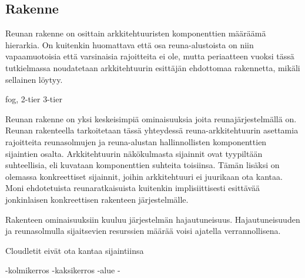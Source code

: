 \subsection{Rakenne}
Reunan rakenne on osittain arkkitehtuuristen komponenttien määräämä hierarkia. On kuitenkin huomattava että osa reuna-alustoista on niin vapaamuotoisia että varsinaisia rajoitteita ei ole, mutta periaatteen vuoksi tässä tutkielmassa noudatetaan arkkitehtuurin esittäjän ehdottomaa rakennetta, mikäli sellainen löytyy.

fog,
2-tier
3-tier

Reunan rakenne on yksi keskeisimpiä ominaisuuksia joita reunajärjestelmällä on. Reunan rakenteella tarkoitetaan tässä yhteydessä reuna-arkkitehtuurin asettamia rajoitteita reunasolmujen ja reuna-alustan hallinnollisten komponenttien sijaintien osalta. 
Arkkitehtuurin näkökulmasta sijainnit ovat tyypiltään suhteellisia, eli kuvataan komponenttien suhteita toisiinsa.
Tämän lisäksi on olemassa konkreettiset sijainnit, joihin arkkitehtuuri ei juurikaan ota kantaa.
Moni ehdotetuista reunaratkaisuista kuitenkin implisiittisesti esittävää jonkinlaisen konkreettisen rakenteen järjestelmälle. 

Rakenteen ominaisuuksiin kuuluu järjestelmän hajautuneisuus. Hajautuneisuuden ja reunasolmulla sijaitsevien resurssien määrää voisi ajatella verrannollisena. 

Cloudletit eivät ota kantaa sijaintiinsa \cite{satyanarayanan2017emergence}

-kolmikerros
-kaksikerros
-alue
-
